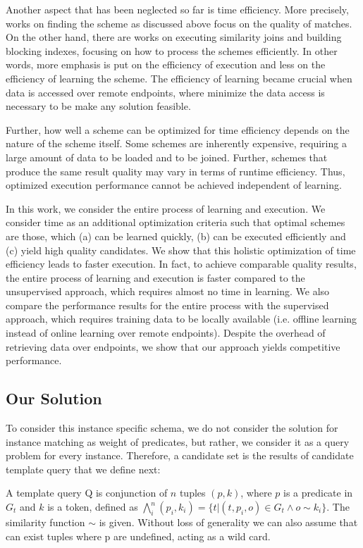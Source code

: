 Another aspect that has been neglected so far is time efficiency. More precisely, works on finding the scheme as discussed above focus on the quality of matches. On the other hand, there are works on executing similarity joins and building blocking indexes, focusing on how to process the schemes efficiently. In other words, more emphasis is put on the efficiency of execution and less on the efficiency of learning the scheme. The efficiency of learning became crucial when data is accessed over remote endpoints, where minimize the data access is necessary to be make any solution feasible.  

Further, how well a scheme can be optimized for time efficiency depends on the nature of the scheme itself. Some schemes are inherently expensive, requiring a large amount of data to be loaded and to be joined. Further, schemes that produce the same result quality may vary in terms of runtime efficiency. Thus, optimized execution performance cannot be achieved independent of learning. 

In this work, we consider the entire process of learning and execution. We consider time as an additional optimization criteria such that optimal schemes are those, which (a) can be learned quickly, (b) can be executed efficiently and (c) yield high quality candidates. We show that this holistic optimization of time efficiency leads to faster execution. In fact, to achieve comparable quality results, the entire process of learning and execution is faster compared to the unsupervised approach, which requires almost no time in learning.  We also compare the performance results for the entire process with the supervised approach, which requires training data to be locally available (i.e. offline learning instead of online learning over remote endpoints). Despite the overhead of retrieving data over endpoints, we show that our approach yields competitive performance. 


\subsection{Our Solution}
To consider this instance specific schema, we do not consider the solution for instance matching as weight of predicates, but rather, we consider it as a query problem for every instance. Therefore, a candidate set is the results of candidate template query that we define next:

\begin{definition}   A template query Q is conjunction of $n$ tuples $(p, k)$, where $p$ is a predicate in $G_t$ and $k$ is a token, defined as $ \bigwedge_{i}^n (p_i, k_i)=\{t | (t,p_i,o) \in G_t  \land o \sim k_i  \}$. The similarity function $\sim$ is given. Without loss of generality we can also assume that can exist tuples where p are undefined, acting as a wild card. 
\end{definition} 
 
